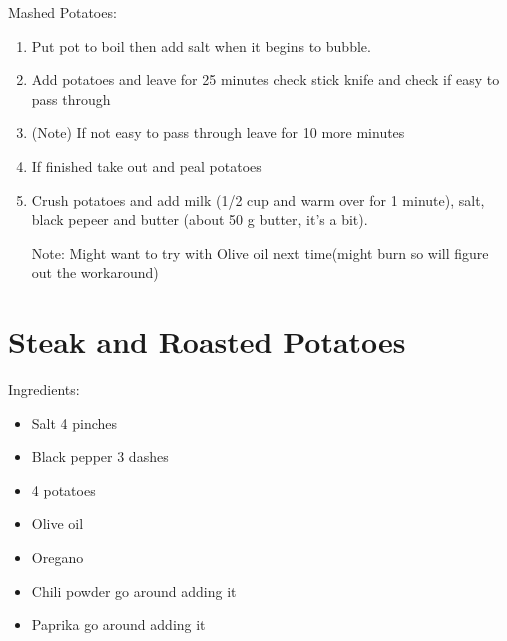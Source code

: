 \documentclass{article}
\begin{document}
Mashed Potatoes:

\begin{enumerate}
    \item Put pot to boil then add salt when it begins to bubble.
    \item Add potatoes and leave for 25 minutes check stick knife and check if easy to pass through
    \item (Note) If not easy to pass through leave for 10 more minutes
    \item If finished take out and peal potatoes
    \item Crush potatoes and add milk (1/2 cup and warm over for 1 minute), salt, black pepeer and butter (about 50 g butter, it's a bit).

Note: Might want to try with Olive oil next time(might burn so will figure out the workaround)
\end{enumerate}

\newpage


\section{Steak and Roasted Potatoes}

Ingredients:

\begin{itemize}
    \item Salt 4 pinches
    \item Black pepper 3 dashes 
    \item 4 potatoes
    \item Olive oil 
    \item Oregano 
    \item Chili powder go around adding it 
    \item Paprika go around adding it 
\end{itemize}
\end{document}
